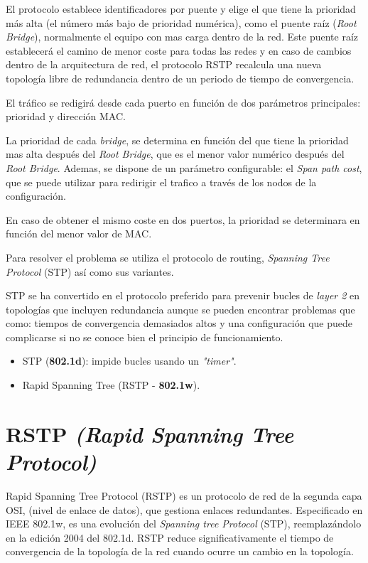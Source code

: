 El protocolo establece identificadores por puente y elige el que tiene la prioridad más alta (el número más bajo de prioridad numérica), como el puente raíz (\textit{Root Bridge}), normalmente el equipo con mas carga dentro de la red. Este puente raíz establecerá el camino de menor coste para todas las redes y en caso de cambios dentro de la arquitectura de red, el protocolo RSTP recalcula una nueva topología libre de redundancia dentro de un periodo de tiempo de convergencia.

El tráfico se redigirá desde cada puerto en función de dos parámetros principales: prioridad y dirección MAC.

La prioridad de cada \textit{bridge}, se determina  en función del que tiene la prioridad mas alta después del \textit{Root Bridge}, que es el menor valor numérico después del\textit{ Root Bridge}. Ademas, se dispone de un parámetro configurable: el \textit{Span path cost}, que se puede utilizar para redirigir el trafico a través de los nodos de la configuración.

En caso de obtener el mismo coste en dos puertos, la prioridad se determinara en función del menor valor de MAC.

Para resolver el problema se utiliza el protocolo de routing, \textit{Spanning Tree Protocol} (STP) así como sus variantes.

STP se ha convertido en el protocolo preferido para prevenir bucles de \textit{layer 2} en topologías que incluyen redundancia aunque se pueden encontrar problemas que como: tiempos de convergencia demasiados altos y una configuración que puede complicarse si no se conoce bien el principio de funcionamiento.

\begin{itemize}
	\item STP (\textbf{802.1d}): impide bucles usando un \textit{"timer"}.
	\item Rapid Spanning Tree (RSTP - \textbf{802.1w}).
\end{itemize}

\section{RSTP \textit{(Rapid Spanning Tree Protocol)}}

Rapid Spanning Tree Protocol (RSTP) es un protocolo de red de la segunda capa OSI, (nivel de enlace de datos), que gestiona enlaces redundantes. Especificado en IEEE 802.1w, es una evolución del \textit{Spanning tree Protocol} (STP), reemplazándolo en la edición 2004 del 802.1d. RSTP reduce significativamente el tiempo de convergencia de la topología de la red cuando ocurre un cambio en la topología.

